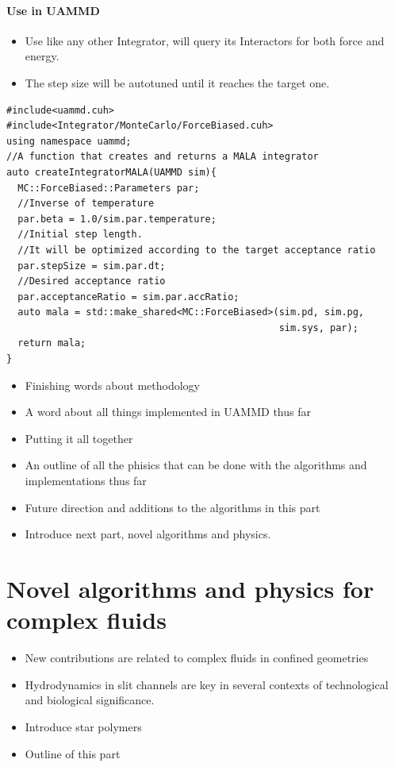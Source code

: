 \documentclass[ twoside,openright,titlepage,numbers=noenddot,%
headinclude,footinclude,cleardoublepage=empty,abstract=on,
BCOR=5mm,paper=a4,fontsize=11pt, dvipsnames
]{scrreprt}
\def\ucpp{uammd_cpp_lexer.py:UAMMDCppLexer -x}
\begin{document}
\subsection*{Use in UAMMD}

\begin{itemize}
\item Use like any other Integrator, will query its Interactors for both force and energy.
\item The step size will be autotuned until it reaches the target one.
\end{itemize}
\begin{verbatim}
#include<uammd.cuh>
#include<Integrator/MonteCarlo/ForceBiased.cuh>
using namespace uammd;
//A function that creates and returns a MALA integrator
auto createIntegratorMALA(UAMMD sim){   
  MC::ForceBiased::Parameters par;
  //Inverse of temperature
  par.beta = 1.0/sim.par.temperature;	
  //Initial step length.
  //It will be optimized according to the target acceptance ratio
  par.stepSize = sim.par.dt;
  //Desired acceptance ratio 
  par.acceptanceRatio = sim.par.accRatio;
  auto mala = std::make_shared<MC::ForceBiased>(sim.pd, sim.pg, 
                                                sim.sys, par);
  return mala;
}
\end{verbatim}



\begin{itemize}
\item Finishing words about methodology
\item A word about all things implemented in UAMMD thus far
\item Putting it all together
\item An outline of all the phisics that can be done with the algorithms and implementations thus far
\item Future direction and additions to the algorithms in this part
\item Introduce next part, novel algorithms and physics.

\end{itemize}
\cleardoublepage
\part{Novel algorithms and physics for complex fluids}\label{pt:algo}

\begin{itemize}
\item New contributions are related to complex fluids in confined geometries
\item Hydrodynamics in slit channels are key in several contexts of technological and biological significance.
\item Introduce star polymers
\item Outline of this part
\end{itemize}
\end{document}
